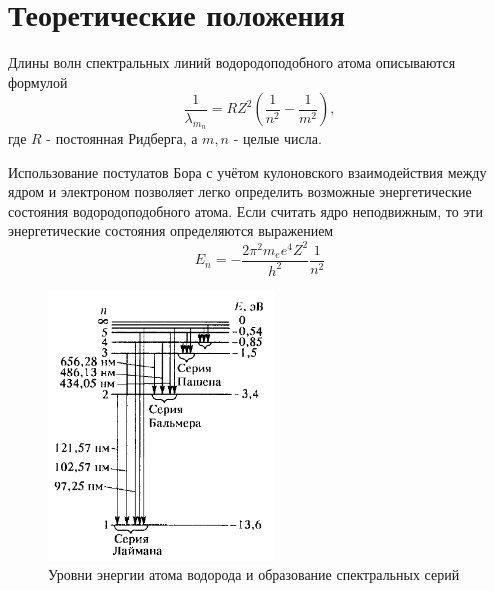 \documentclass[a4paper]{article}
\begin{document}
\section{Теоретические положения}
Длины волн спектральных линий водородоподобного атома описываются формулой
\begin{equation}
    \frac{1}{\lambda_m_n} = RZ^2(\frac{1}{n^2} - \frac{1}{m^2}),
\end{equation}
где $R$ - постоянная Ридберга, а $m, n$ -  целые числа. \par
Использование постулатов Бора с учётом кулоновского взаимодействия между ядром и электроном позволяет легко определить возможные энергетические состояния водородоподобного атома. Если считать ядро неподвижным, то эти энергетические состояния определяются выражением
\begin{equation}
    E_n = -\frac{2 \pi^2 m_e e^4 Z^2}{h^2} \frac{1}{n^2}
\end{equation}

\begin{figure}[h]
    \centering
    \includegraphics[width=6cm]{fig3.PNG}
    \caption{Уровни энергии атома водорода и образование спектральных серий}
    \label{fig:vac}
\end{figure}
\end{document}

